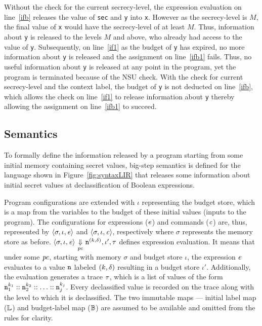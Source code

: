 Without the check for the current secrecy-level, the
expression evaluation on line~\ref{ifb} releases the value of 
\texttt{sec} and \texttt{y} into \texttt{x}. However as the
secrecy-level is $M$, the final value of \texttt{x} would have the
secrecy-level of at least $M$. Thus, information about \texttt{y} is
released to the levels $M$ and above, who already had access to the
value of \texttt{y}. Subsequently, on line~\ref{if1} as the budget of
\texttt{y} has expired, no more information about \texttt{y} is
released and the assignment on line~\ref{ifb1} fails. Thus, no useful
information about \texttt{y} is released at any point in the program,
yet the program is terminated because of the NSU check. With the check 
for current secrecy-level and the context label, the budget of
\texttt{y} is not deducted on line~\ref{ifb}, which allows the check
on line~\ref{if1} to release information about \texttt{y} 
thereby allowing the assignment on line~\ref{ifb1} to succeed.


\subsection{Semantics}
\label{sec:semantics}
To formally define the information released by a program starting from some
initial memory containing secret values, big-step semantics is defined
for the language shown in Figure~\ref{fig:syntaxLIR} that releases
some information about initial secret values at declassification of 
Boolean expressions.

Program configurations are extended with $\iota$ representing the
budget store, which is a map from the variables to the budget of these
initial  values (inputs to the program). The configurations for
expressions ($\mathit{e}$) and commands ($\mathit{c}$) are, thus, represented
by $\langle \sigma, \iota, \mathit{e} \rangle$ and $\langle \sigma, \iota, 
\mathit{c} \rangle$, respectively where $\sigma$ represents the memory
store as before. 
$\langle\sigma, \iota, \mathit{e} \rangle {~\underset{\mathit{pc}}{\Downarrow}~} \texttt{n}^{(k, \delta)}, \iota',
\tau$ defines expression evaluation. It means that under some
$\mathit{pc}$, starting with memory $\sigma$ and budget store $\iota$, the
expression $\mathit{e}$ evaluates to a value $\texttt{n}$ labeled
$(k, \delta)$ resulting in a budget store $\iota'$. Additionally, the
evaluation generates a trace $\tau$, which is a list of values of the
form $\texttt{n}_1^{k_1} :: \texttt{n}_2^{k_2} :: \ldots ::
\texttt{n}_j^{k_j}$. Every declassified value is recorded on the trace along
with the level to which it is declassified. The two immutable maps ---
initial label map ($\mathbb{L}$) and budget-label map ($\mathbb{B}$) are
assumed to be available and omitted from the rules for clarity.

